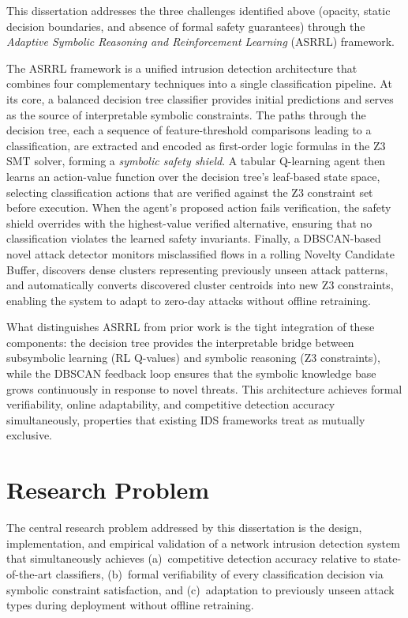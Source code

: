 \documentclass[12pt, letterpaper, oneside]{report}
\newcommand{\ASRRL}{\textsc{ASRRL}}
\begin{document}
This dissertation addresses the three challenges identified above (opacity, static decision boundaries, and absence of formal safety guarantees) through the \emph{Adaptive Symbolic Reasoning and Reinforcement Learning} (\ASRRL{}) framework.

The \ASRRL{} framework is a unified intrusion detection architecture that combines four complementary techniques into a single classification pipeline. At its core, a balanced decision tree classifier provides initial predictions and serves as the source of interpretable symbolic constraints. The paths through the decision tree, each a sequence of feature-threshold comparisons leading to a classification, are extracted and encoded as first-order logic formulas in the Z3 SMT solver, forming a \emph{symbolic safety shield}. A tabular Q-learning agent then learns an action-value function over the decision tree's leaf-based state space, selecting classification actions that are verified against the Z3 constraint set before execution. When the agent's proposed action fails verification, the safety shield overrides with the highest-value verified alternative, ensuring that no classification violates the learned safety invariants. Finally, a DBSCAN-based novel attack detector monitors misclassified flows in a rolling Novelty Candidate Buffer, discovers dense clusters representing previously unseen attack patterns, and automatically converts discovered cluster centroids into new Z3 constraints, enabling the system to adapt to zero-day attacks without offline retraining.

What distinguishes \ASRRL{} from prior work is the tight integration of these components: the decision tree provides the interpretable bridge between subsymbolic learning (RL Q-values) and symbolic reasoning (Z3 constraints), while the DBSCAN feedback loop ensures that the symbolic knowledge base grows continuously in response to novel threats. This architecture achieves formal verifiability, online adaptability, and competitive detection accuracy simultaneously, properties that existing IDS frameworks treat as mutually exclusive.


\section{Research Problem}
\label{sec:research_problem}

The central research problem addressed by this dissertation is the design, implementation, and empirical validation of a network intrusion detection system that simultaneously achieves (a)~competitive detection accuracy relative to state-of-the-art classifiers, (b)~formal verifiability of every classification decision via symbolic constraint satisfaction, and (c)~adaptation to previously unseen attack types during deployment without offline retraining.
\end{document}

